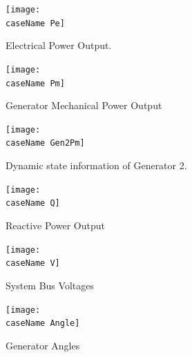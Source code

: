 \documentclass[12pt]{article}
\begin{document}
\pagebreak
	\begin{figure}[h!]
			\centering
			\texttt{[image: \\caseName Pe]}\vspace{-.5em}
			\caption{Electrical Power Output.}
			\label{\caseName Pe}		 
	\end{figure}%
	\begin{figure}[h!]
			\centering
			\texttt{[image: \\caseName Pm]}\vspace{-.5em}
			\caption{Generator Mechanical Power Output}
			\label{\caseName Pm}		 
	\end{figure}%

	\begin{figure}[h!]
			\centering
			\texttt{[image: \\caseName Gen2Pm]}\vspace{-.5em}
			\caption{Dynamic state information of Generator 2.}
			\label{\caseName V}		 
	\end{figure}%
\pagebreak

	\begin{figure}[h!]
			\centering
			\texttt{[image: \\caseName Q]}\vspace{-.5em}
			\caption{Reactive Power Output}
			\label{\caseName Q}		 
	\end{figure}%

	\begin{figure}[h!]
			\centering
			\texttt{[image: \\caseName V]}\vspace{-.5em}
			\caption{System Bus Voltages}
			\label{\caseName V}		 
	\end{figure}%
	\begin{figure}[h!]
			\centering
			\texttt{[image: \\caseName Angle]}\vspace{-.5em}
			\caption{Generator Angles}
			\label{\caseName Angle}		 
	\end{figure}%
\end{document}
